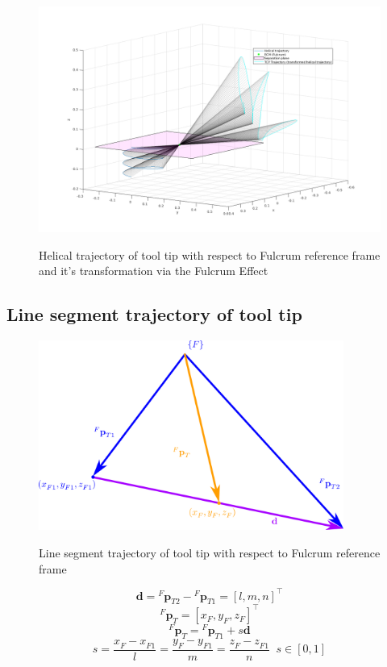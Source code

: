 \begin{center}
\begin{figure}[H]
\centering
\includegraphics[width=\textwidth]{images/rcm_trajectories/rcm_helical_traj.png}\\
\caption{Helical trajectory of tool tip with respect to Fulcrum reference frame and it's transformation via the Fulcrum Effect}
\end{figure}
\end{center}

\subsection{Line segment trajectory of tool tip}

\begin{center}
\begin{figure}[H]
\centering
\includegraphics[width=10cm]{images/line-segment-trajectory-wrt-fulcrum.png}\\
\caption{Line segment trajectory of tool tip with respect to Fulcrum reference frame}
\end{figure}
\end{center}
\[
\mathbf{d} = {}^{F}\mathbf{p}^{}_{T2} - {}^{F}\mathbf{p}^{}_{T1} = [l, m, n]^\top
\]
\[
{}^{F}\mathbf{p}^{}_{T} = [x^{}_{F}, y^{}_{F}, z^{}_{F}]^\top
\]
\[
{}^{F}\mathbf{p}^{}_{T} = {}^{F}\mathbf{p}^{}_{T1} + s\mathbf{d}
\]
\[
s = \frac{x^{}_{F} - x^{}_{F1}}{l} = \frac{y^{}_{F} - y^{}_{F1}}{m} = \frac{z^{}_{F} - z^{}_{F1}}{n} \;\; s \in [0, 1]
\]

